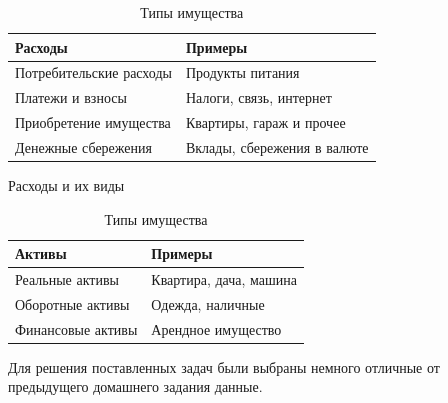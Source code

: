 \documentclass[12pt]{report}
\begin{document}
\begin{table}[H]
    \parbox{0.45\linewidth}{\begin{tabular}{|l|l|}
    \hline
    Расходы                 & Примеры                     \\ \hline
    Потребительские расходы & Продукты питания            \\ \hline
    Платежи и взносы        & Налоги, связь, интернет     \\ \hline
    Приобретение имущества  & Квартиры, гараж и прочее    \\ \hline
    Денежные сбережения     & Вклады, сбережения в валюте \\ \hline
    \end{tabular}
    \caption{Расходы и их виды}
    } \hspace*{2cm}
       \parbox{0.45\linewidth}{\begin{tabular}{|l|l|}
        \hline
        Активы            & Примеры                \\ \hline
        Реальные активы   & Квартира, дача, машина \\ \hline
        Оборотные активы  & Одежда, наличные       \\ \hline
        Финансовые активы & Арендное имущество     \\ \hline
        \end{tabular}
        \caption{Типы имущества}
        }
\end{table}
Для решения поставленных задач были выбраны немного отличные от предыдущего домашнего задания данные.
\end{document}
